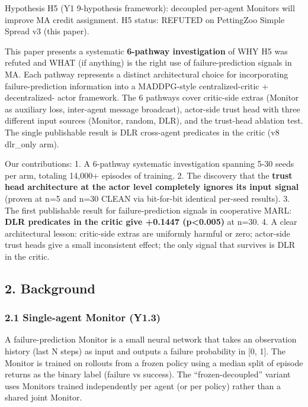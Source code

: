 \documentclass[
]{article}
\begin{document}
Hypothesis H5 (Y1 9-hypothesis framework): decoupled per-agent Monitors
will improve MA credit assignment. H5 status: REFUTED on PettingZoo
Simple Spread v3 (this paper).

This paper presents a systematic \textbf{6-pathway investigation} of WHY
H5 was refuted and WHAT (if anything) is the right use of
failure-prediction signals in MA. Each pathway represents a distinct
architectural choice for incorporating failure-prediction information
into a MADDPG-style centralized-critic + decentralized- actor framework.
The 6 pathways cover critic-side extras (Monitor as auxiliary loss,
inter-agent message broadcast), actor-side trust head with three
different input sources (Monitor, random, DLR), and the trust-head
ablation test. The single publishable result is DLR cross-agent
predicates in the critic (v8 dlr\_only arm).

Our contributions: 1. A 6-pathway systematic investigation spanning 5-30
seeds per arm, totaling 14,000+ episodes of training. 2. The discovery
that the \textbf{trust head architecture at the actor level completely
ignores its input signal} (proven at n=5 and n=30 CLEAN via bit-for-bit
identical per-seed results). 3. The first publishable result for
failure-prediction signals in cooperative MARL: \textbf{DLR predicates
in the critic give +0.1447 (p\textless0.005)} at n=30. 4. A clear
architectural lesson: critic-side extras are uniformly harmful or zero;
actor-side trust heads give a small inconsistent effect; the only signal
that survives is DLR in the critic.

\subsection{2. Background}\label{background}

\subsubsection{2.1 Single-agent Monitor
(Y1.3)}\label{single-agent-monitor-y1.3}

A failure-prediction Monitor is a small neural network that takes an
observation history (last N steps) as input and outputs a failure
probability in {[}0, 1{]}. The Monitor is trained on rollouts from a
frozen policy using a median split of episode returns as the binary
label (failure vs success). The ``frozen-decoupled'' variant uses
Monitors trained independently per agent (or per policy) rather than a
shared joint Monitor.
\end{document}
